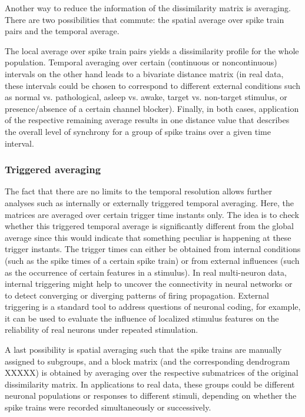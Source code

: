 \documentclass[10pt,twocolumn]{elsart5p}
\begin{document}
Another way to reduce the information of the dissimilarity matrix is averaging. There are two possibilities that commute: the spatial average over spike train pairs and the temporal average.

The local average over spike train pairs yields a dissimilarity profile for the whole population. Temporal averaging over certain (continuous or noncontinuous) intervals on the other hand leads to a bivariate distance matrix (in real data, these intervals could be chosen to correspond to different external conditions such as normal vs. pathological, asleep vs. awake, target vs. non-target stimulus, or presence/absence of a certain channel blocker). Finally, in both cases, application of the respective remaining average results in one distance value that describes the overall level of synchrony for a group of spike trains over a given time interval.

\subsubsection{\label{sss:Triggered-Averaging} Triggered averaging}

The fact that there are no limits to the temporal resolution allows further analyses such as internally or externally triggered temporal averaging. Here, the matrices are averaged over certain trigger time instants only. The idea is to check whether this triggered temporal average is significantly different from the global average since this would indicate that something peculiar is happening at these trigger instants. The trigger times can either be obtained from internal conditions (such as the spike times of a certain spike train) or from external influences (such as the occurrence of certain features in a stimulus). In real multi-neuron data, internal triggering might help to uncover the connectivity in neural networks or to detect converging or diverging patterns of firing propagation. External triggering is a standard tool to address questions of neuronal coding, for example, it can be used to evaluate the influence of localized stimulus features on the reliability of real neurons under repeated stimulation.

A last possibility is spatial averaging such that the spike trains are manually assigned to subgroups, and a block matrix (and the corresponding dendrogram XXXXX) is obtained by averaging over the respective submatrices of the original dissimilarity matrix. In applications to real data, these groups could be different neuronal populations or responses to different stimuli, depending on whether the spike trains were recorded simultaneously or successively.
\end{document}
